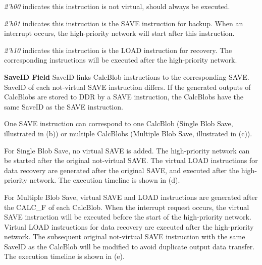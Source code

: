 	\textit{2'b00} indicates this instruction is not virtual, should always be executed.
	
	\textit{2'b01} indicates this instruction is the SAVE instruction for backup. When an interrupt occurs, the high-priority network will start after this instruction.
	
	\textit{2'b10} indicates this instruction is the LOAD instruction for recovery. The corresponding instructions will be executed after the high-priority network.

\textbf{ SaveID Field }
SaveID links CalcBlob instructions to the corresponding SAVE. SaveID of each not-virtual SAVE instruction differs. If the generated outputs of CalcBlobs are stored to DDR by a SAVE instruction, the CalcBlobs have the same SaveID as the SAVE instruction.

One SAVE instruction can correspond to one CalcBlob (Single Blob Save, illustrated in (b)) or multiple CalcBlobs (Multiple Blob Save, illustrated in (c)).

For Single Blob Save, no virtual SAVE is added. The high-priority network can be started after the original not-virtual SAVE. The virtual LOAD instructions for data recovery are generated after the original SAVE, and executed after the high-priority network. The execution timeline is shown in (d).

For Multiple Blob Save, virtual SAVE and LOAD instructions are generated after the CALC\_F of each CalcBlob. When the interrupt request occurs, the virtual SAVE instruction will be executed before the start of the high-priority network. Virtual LOAD instructions for data recovery are executed after the high-priority network. The subsequent original not-virtual SAVE instruction with the same SaveID as the CalcBlob will be modified to avoid duplicate output data transfer. The execution timeline is shown in (e).


